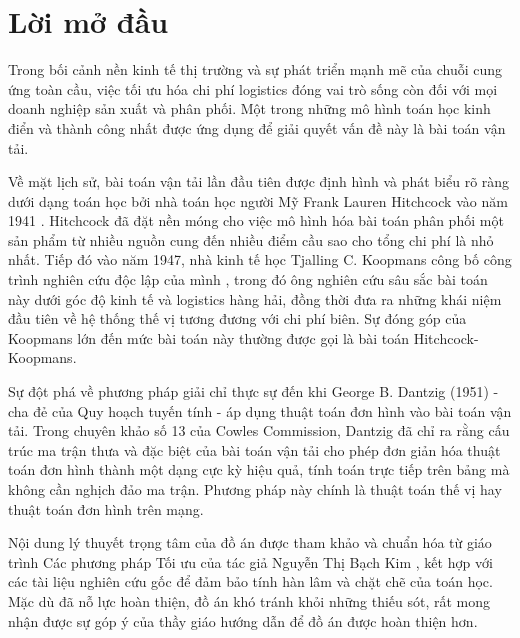 \documentclass[main.tex]{subfiles}
\begin{document}
{}
\chapter*{Lời mở đầu}
    
Trong bối cảnh nền kinh tế thị trường và sự phát triển mạnh mẽ của chuỗi cung ứng toàn cầu, việc tối ưu hóa chi phí logistics đóng vai trò sống còn đối với mọi doanh nghiệp sản xuất và phân phối. Một trong những mô hình toán học kinh điển và thành công nhất được ứng dụng để giải quyết vấn đề này là bài toán vận tải. 
    
Về mặt lịch sử, bài toán vận tải lần đầu tiên được định hình và phát biểu rõ ràng dưới dạng toán học bởi nhà toán học người Mỹ Frank Lauren Hitchcock vào năm 1941 \cite{hitchcock1941}. Hitchcock đã đặt nền móng cho việc mô hình hóa bài toán phân phối một sản phẩm từ nhiều nguồn cung đến nhiều điểm cầu sao cho tổng chi phí là nhỏ nhất. Tiếp đó vào năm 1947, nhà kinh tế học Tjalling C. Koopmans công bố công trình nghiên cứu độc lập của mình \cite{koopmans1949}, trong đó ông nghiên cứu sâu sắc bài toán này dưới góc độ kinh tế và logistics hàng hải, đồng thời đưa ra những khái niệm đầu tiên về hệ thống thế vị tương đương với chi phí biên. Sự đóng góp của Koopmans lớn đến mức bài toán này thường được gọi là bài toán Hitchcock-Koopmans.
    
Sự đột phá về phương pháp giải chỉ thực sự đến khi George B. Dantzig (1951) \cite{dantzig1951} - cha đẻ của Quy hoạch tuyến tính - áp dụng thuật toán đơn hình vào bài toán vận tải. Trong chuyên khảo số 13 của Cowles Commission, Dantzig đã chỉ ra rằng cấu trúc ma trận thưa và đặc biệt của bài toán vận tải cho phép đơn giản hóa thuật toán đơn hình thành một dạng cực kỳ hiệu quả, tính toán trực tiếp trên bảng mà không cần nghịch đảo ma trận. Phương pháp này chính là thuật toán thế vị hay thuật toán đơn hình trên mạng.

Nội dung lý thuyết trọng tâm của đồ án được tham khảo và chuẩn hóa từ giáo trình Các phương pháp Tối ưu của tác giả Nguyễn Thị Bạch Kim \cite{bachkim}, kết hợp với các tài liệu nghiên cứu gốc để đảm bảo tính hàn lâm và chặt chẽ của toán học. Mặc dù đã nỗ lực hoàn thiện, đồ án khó tránh khỏi những thiếu sót, rất mong nhận được sự góp ý của thầy giáo hướng dẫn để đồ án được hoàn thiện hơn.
\end{document}
